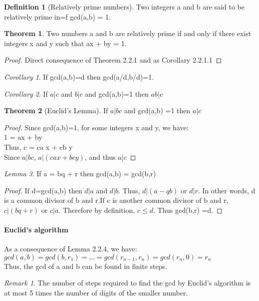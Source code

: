 \documentclass[15,a4paper]{report}
\theoremstyle{definition}
\newtheorem{definition}{Definition}[section]
\newtheorem{theorem}{Theorem}[section]
\theoremstyle{remark}
\newtheorem*{remark}{Remark}
\newtheorem{corollary}{Corollary}[theorem]
\newtheorem{lemma}[theorem]{Lemma}
\begin{document}
\begin{definition}[Relatively prime numbers]
    Two integers a and b are said to be relatively prime in=f gcd(a,b) = 1.
\end{definition}
\begin{theorem}
    Two numbers a and b are relatively prime if and only if there exist integers x and y such that ax + by = 1.
\end{theorem}
\begin{proof}
    Direct consequence of Theorem 2.2.1 and as Corollary 2.2.1.1
\end{proof}

\begin{corollary}
     If gcd(a,b)=d then gcd(a/d,b/d)=1.
\end{corollary}
\begin{corollary}
    If $a|c$ and $b|c$ and gcd(a,b)=1 then $ab|c$
\end{corollary}

\begin{theorem}[Euclid's Lemma]
    If $a|bc$ and gcd(a,b) =1 then $a|c$
\end{theorem}
\begin{proof}
    Since gcd(a,b)=1, for some integers x and y, we have:\\
    1 = ax + by\\
    Thus, c = ca x + cb y\\
    Since $a|bc$, $a|(cax + bcy)$, and thus $a|c$
\end{proof}

\begin{lemma}
    If a = bq + r then gcd(a,b) = gcd(b,r)
\end{lemma}
\begin{proof}
    If d=gcd(a,b) then $d|a$ and $d|b$. Thus, $d|(a-qb)$ or $d|r$. In other words, d is a common divisor of b and r.If c is another common divisor of b and r, $c|(bq + r)$ or $c|a$. Therefore by definition, $c \leq d$. Thus gcd(b,r) =d.
\end{proof}

\paragraph{Euclid's algorithm} As a consequence of Lemma 2.2.4, we have:\\
$gcd(a,b) = gcd(b,r_1) = \dots = gcd(r_{n-1},r_n)=gcd(r_n,0) = r_n$\\
Thus, the gcd of a and b can be found in finite steps.
\begin{remark}
    The number of steps required to find the gcd by Euclid's algorithm is at most 5 times the number of digits of the smaller number.
\end{remark}
\end{document}
